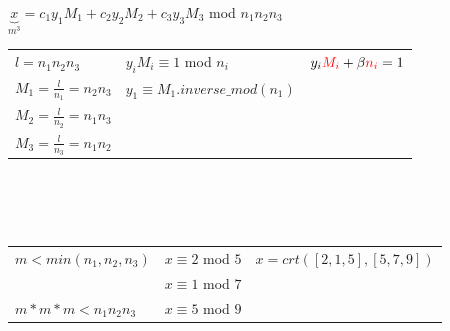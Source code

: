 \documentclass[10pt]{article}
\begin{document}
$\underbrace{x}_{m^3} = c_1 y_1 M_1 + c_2 y_2 M_2 + c_3 y_3 M_3$ mod $n_1n_2n_3$ \\ 

\begin{tabular}{p{5cm}  p{5cm} l }
	$l=n_1n_2n_3$ & $y_iM_i\equiv 1$ mod $n_i$ & $y_i{\color{red}M_i} + \beta {\color{red}n_i}=1$\\
	$M_1 = \frac{l}{n_1} = n_2n_3$ & $y_1\equiv M_1.inverse\_mod(n_1)$ \\
	$M_2 = \frac{l}{n_2} = n_1n_3$ \\
	$M_3 = \frac{l}{n_3} = n_1n_2$ \\
\end{tabular} \\ \\
\\
\begin{tabular}{p{5cm}  p{5cm} l }
	$m < min(n_1,n_2,n_3)$ & $x\equiv2$ mod $5$ & $x= crt([2,1,5],[5,7,9])$ \\
	& $x\equiv1$ mod $7$ \\
	$m*m*m < n_1n_2n_3$ & $x\equiv5$ mod $9$ & \\
\end{tabular}
\end{document}
